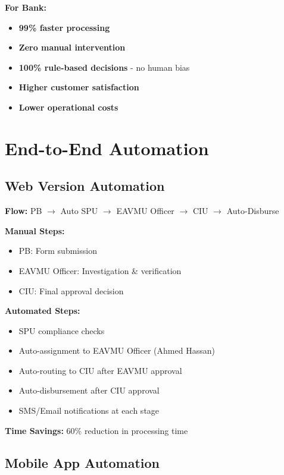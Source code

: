 \documentclass[12pt,a4paper]{article}
\begin{document}
\textbf{For Bank:}
\begin{itemize}
    \item \textbf{99\% faster processing}
    \item \textbf{Zero manual intervention}
    \item \textbf{100\% rule-based decisions} - no human bias
    \item \textbf{Higher customer satisfaction}
    \item \textbf{Lower operational costs}
\end{itemize}

\newpage

\section{End-to-End Automation}

\subsection{Web Version Automation}

\textbf{Flow:} PB $\rightarrow$ Auto SPU $\rightarrow$ EAVMU Officer $\rightarrow$ CIU $\rightarrow$ Auto-Disburse

\textbf{Manual Steps:}
\begin{itemize}
    \item PB: Form submission
    \item EAVMU Officer: Investigation \& verification
    \item CIU: Final approval decision
\end{itemize}

\textbf{Automated Steps:}
\begin{itemize}
    \item SPU compliance checks
    \item Auto-assignment to EAVMU Officer (Ahmed Hassan)
    \item Auto-routing to CIU after EAVMU approval
    \item Auto-disbursement after CIU approval
    \item SMS/Email notifications at each stage
\end{itemize}

\textbf{Time Savings:} 60\% reduction in processing time

\subsection{Mobile App Automation}
\end{document}
